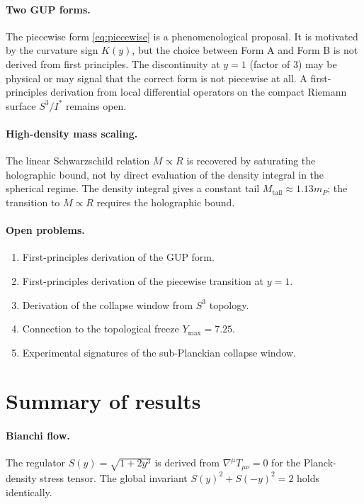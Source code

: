 \documentclass[a4paper,1pt,oneside,openany]{book}
\begin{document}
\paragraph{Two GUP forms.}
The piecewise form \eqref{eq:piecewise} is a phenomenological 
proposal. It is motivated by the curvature sign $K(y)$, but the 
choice between Form A and Form B is not derived from first 
principles. The discontinuity at $y=1$ (factor of $3$) may be 
physical or may signal that the correct form is not piecewise 
at all. A first-principles derivation from local differential 
operators on the compact Riemann surface $S^{3}/I^{*}$ remains 
open.

\paragraph{High-density mass scaling.}
The linear Schwarzschild relation $M\propto R$ is recovered by 
saturating the holographic bound, not by direct evaluation of 
the density integral in the spherical regime. The density 
integral gives a constant tail $M_{\text{tail}}\approx 
1.13 m_{P}$; the transition to $M\propto R$ requires the 
holographic bound.

\paragraph{Open problems.}
\begin{enumerate}
\item First-principles derivation of the GUP form.
\item First-principles derivation of the piecewise transition 
at $y=1$.
\item Derivation of the collapse window from $S^{3}$ topology.
\item Connection to the topological freeze $Y_{\max}=7.25$.
\item Experimental signatures of the sub-Planckian collapse 
window.
\end{enumerate}

\section{Summary of results}

\paragraph{Bianchi flow.}
The regulator $S(y)=\sqrt{1+2y^{3}}$ is derived from 
$\nabla^{\mu}T_{\mu\nu}=0$ for the Planck-density stress 
tensor. The global invariant 
$S(y)^{2}+S(-y)^{2}=2$ holds identically.
\end{document}
